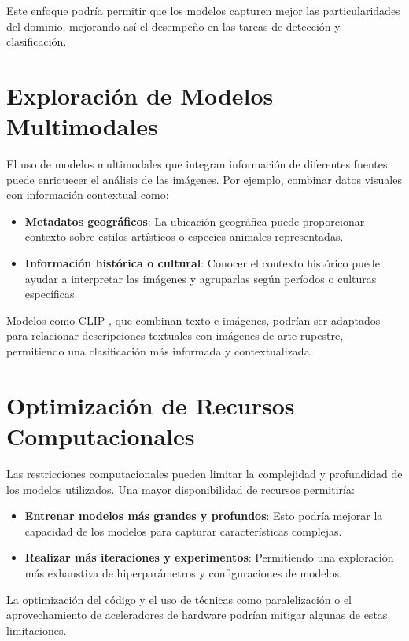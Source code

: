 Este enfoque podría permitir que los modelos capturen mejor las particularidades del dominio, mejorando así el desempeño en las tareas de detección y clasificación.

\section{Exploración de Modelos Multimodales}

El uso de modelos multimodales que integran información de diferentes fuentes puede enriquecer el análisis de las imágenes. Por ejemplo, combinar datos visuales con información contextual como:

\begin{itemize}
    \item \textbf{Metadatos geográficos}: La ubicación geográfica puede proporcionar contexto sobre estilos artísticos o especies animales representadas.
    \item \textbf{Información histórica o cultural}: Conocer el contexto histórico puede ayudar a interpretar las imágenes y agruparlas según períodos o culturas específicas.
\end{itemize}

Modelos como CLIP \cite{radford2021learning}, que combinan texto e imágenes, podrían ser adaptados para relacionar descripciones textuales con imágenes de arte rupestre, permitiendo una clasificación más informada y contextualizada.

\section{Optimización de Recursos Computacionales}

Las restricciones computacionales pueden limitar la complejidad y profundidad de los modelos utilizados. Una mayor disponibilidad de recursos permitiría:

\begin{itemize}
    \item \textbf{Entrenar modelos más grandes y profundos}: Esto podría mejorar la capacidad de los modelos para capturar características complejas.
    \item \textbf{Realizar más iteraciones y experimentos}: Permitiendo una exploración más exhaustiva de hiperparámetros y configuraciones de modelos.
\end{itemize}

La optimización del código y el uso de técnicas como paralelización o el aprovechamiento de aceleradores de hardware podrían mitigar algunas de estas limitaciones.

